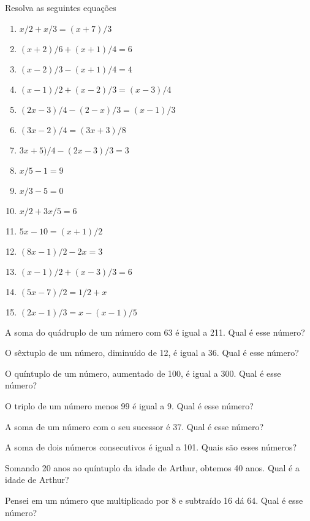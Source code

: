 \item Resolva as seguintes equações
\begin{multicols}{2}				
\begin{enumerate}					
	\item $ x/2 + x/3 = (x + 7)/3$
	\item $(x + 2) / 6 + (x +1)/4 = 6$
	\item $(x -2) /3 - (x + 1)/ 4 =4$
	\item $(x - 1) /2 + (x - 2) /3 = (x -3)/4$
	\item $(2x- 3) / 4 - (2 - x)/3 = (x -1) / 3$
	\item $(3x -2) / 4 = (3x + 3) / 8$
	\item $ 3x + 5) / 4 - (2x - 3) / 3 = 3$
	\item $ x/5 - 1 = 9$
	\item $x/3 - 5 = 0$
	\item $x/2 + 3x/5=6$
	\item $5x - 10 = (x+1)/2$
	\item $(8x - 1) / 2 - 2x = 3$
	\item $(x - 1) /2 + (x - 3)/3 = 6$
	\item $(5x - 7)/2 = 1/2 + x$
	\item $(2x - 1) / 3 = x - (x - 1)/5$
\end{enumerate}	
\end{multicols}

\item A soma do quádruplo de um número com 63 é igual a 211. Qual é esse número?

\item O sêxtuplo de um número, diminuído de 12, é igual a 36. Qual é esse número?

\item O quíntuplo de um número, aumentado de 100, é igual a 300. Qual é esse número?

\item O triplo de um número menos 99 é igual a 9. Qual é esse número?

\item A soma de um número com o seu sucessor é 37. Qual é esse número?

\item A soma de dois números consecutivos é igual a 101. Quais são esses números?

\item Somando 20 anos ao quíntuplo da idade de Arthur, obtemos 40 anos. Qual é a idade de Arthur?

\item Pensei em um número que multiplicado por 8 e subtraído 16 dá 64. Qual é esse número?

